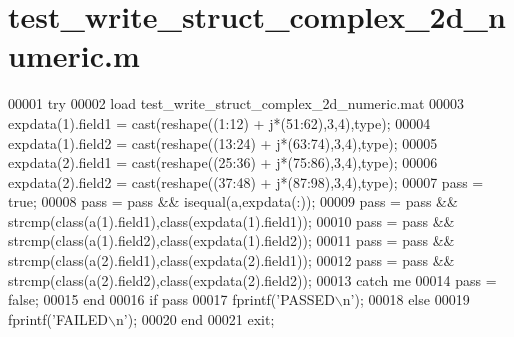 \hypertarget{test__write__struct__complex__2d__numeric_8m_source}{}\section{test\+\_\+write\+\_\+struct\+\_\+complex\+\_\+2d\+\_\+numeric.\+m}
\label{test__write__struct__complex__2d__numeric_8m_source}

\begin{DoxyCode}
00001 \textcolor{keywordflow}{try}
00002     load test\_write\_struct\_complex\_2d\_numeric.mat
00003     expdata(1).field1 = cast(reshape((1:12) + j*(51:62),3,4),type);
00004     expdata(1).field2 = cast(reshape((13:24) + j*(63:74),3,4),type);
00005     expdata(2).field1 = cast(reshape((25:36) + j*(75:86),3,4),type);
00006     expdata(2).field2 = cast(reshape((37:48) + j*(87:98),3,4),type);
00007     pass = \textcolor{keyword}{true};
00008     pass = pass && isequal(a,expdata(:));
00009     pass = pass && strcmp(\textcolor{keyword}{class}(a(1).field1),\textcolor{keyword}{class}(expdata(1).field1));
00010     pass = pass && strcmp(\textcolor{keyword}{class}(a(1).field2),\textcolor{keyword}{class}(expdata(1).field2));
00011     pass = pass && strcmp(\textcolor{keyword}{class}(a(2).field1),\textcolor{keyword}{class}(expdata(2).field1));
00012     pass = pass && strcmp(\textcolor{keyword}{class}(a(2).field2),\textcolor{keyword}{class}(expdata(2).field2));
00013 \textcolor{keywordflow}{catch} me
00014     pass = \textcolor{keyword}{false};
00015 end
00016 \textcolor{keywordflow}{if} pass
00017     fprintf(\textcolor{stringliteral}{'PASSED\(\backslash\)n'});
00018 \textcolor{keywordflow}{else}
00019     fprintf(\textcolor{stringliteral}{'FAILED\(\backslash\)n'});
00020 end
00021 exit;
\end{DoxyCode}
